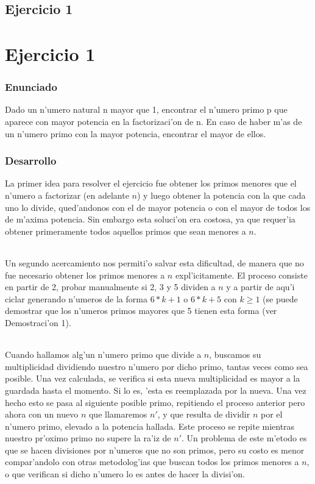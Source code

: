 \chapter{Ejercicio 1}
\part{Ejercicio 1}
\section{Enunciado}
Dado un n'umero natural n mayor que 1, encontrar el n'umero primo p que aparece con mayor potencia en la factorizaci'on de n. En caso de haber m'as de un n'umero primo con  la mayor potencia, encontrar el mayor de ellos.

\section{Desarrollo}
La primer idea para resolver el ejercicio fue obtener los primos menores que el n'umero a factorizar
(en adelante $n$) y luego obtener la potencia con la que cada uno lo divide, qued'andonos con el de mayor
potencia o con el mayor de todos los de m'axima potencia. Sin embargo esta soluci'on era costosa, ya que
requer'ia obtener primeramente todos aquellos primos que sean menores a $n$.
\paragraph{}
Un segundo acercamiento nos permiti'o salvar esta dificultad, de manera que no fue necesario obtener 
los primos menores a $n$ expl'icitamente. El proceso consiste en partir de 2, probar manualmente si 2, 3 y 5 
dividen a $n$ y a partir  de aqu'i ciclar generando n'umeros de la forma $6*k + 1$ o $6*k + 5$ con $k \geq 1$ 
(se puede demostrar que los n'umeros primos mayores que 5 tienen esta forma (ver Demostraci'on 1).
\paragraph{}
Cuando hallamos alg'un n'umero primo que divide a $n$, buscamos su multiplicidad dividiendo nuestro n'umero 
por dicho primo, tantas veces como sea posible. Una vez calculada, se verifica si esta nueva multiplicidad 
es mayor a la guardada hasta el momento. Si lo es, 'esta es reemplazada por la nueva. Una vez hecho esto 
se pasa al siguiente posible primo, repitiendo el proceso anterior pero ahora con un nuevo $n$ que llamaremos 
$n'$, y que resulta de dividir $n$ por el n'umero primo, elevado a la potencia hallada. Este proceso se repite 
mientras nuestro pr'oximo primo no supere la ra'iz de $n'$. Un problema de este m'etodo es que se hacen 
divisiones por n'umeros que no son primos, pero su costo es menor compar'andolo con otras metodolog'ias que
buscan todos los primos menores a $n$, o que verifican si dicho n'umero lo es antes de hacer la divisi'on.
